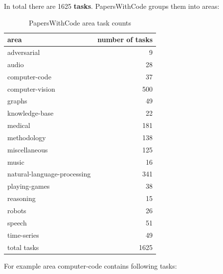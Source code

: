 \documentclass[longabstract,mgr,english]{iithesis}
\begin{document}
In total there are 1625 \textbf{tasks}. PapersWithCode groups them into areas:

\begin{table}[htbp]
\centering
  \caption{PapersWithCode area task counts}
  \begin{tabular}{|l|r|}
\hline
area & number of tasks\\
\hline
adversarial & 9\\
audio & 28\\
computer-code & 37\\
computer-vision & 500\\
graphs & 49\\
knowledge-base & 22\\
medical & 181\\
methodology & 138\\
miscellaneous & 125\\
music & 16\\
natural-language-processing & 341\\
playing-games & 38\\
reasoning & 15\\
robots & 26\\
speech & 51\\
time-series & 49\\
\hline
total tasks & 1625\\
\hline
  \end{tabular}
  \end{table}

For example area computer-code contains following tasks:
\end{document}
